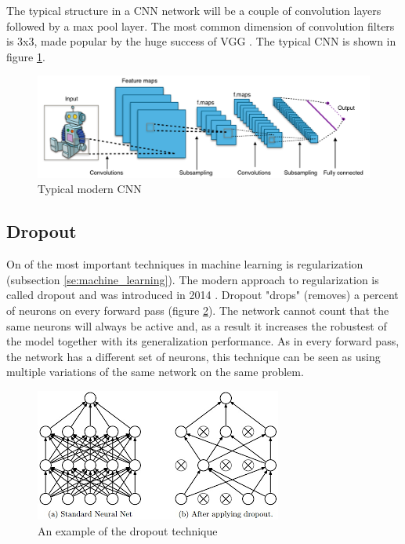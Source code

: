 \documentclass[times, utf8, diplomski]{fer}
\begin{document}
The typical structure in a CNN network will be a couple of convolution layers followed by a max pool layer. The most common dimension of convolution filters is 3x3, made popular by the huge success of VGG \citep{simonyan_very_2014}. The typical CNN is shown in figure \ref{fig:cnn}.

\begin{figure}
  \includegraphics[scale=0.43]{figures/cnn.png}
  \centering
  \caption{Typical modern CNN}
  \label{fig:cnn}
\end{figure}

\subsection{Dropout} \label{se:dropout}

On of the most important techniques in machine learning is regularization (subsection \ref{se:machine_learning}). The modern approach to regularization is called dropout and was introduced in 2014 \citep{srivastava_dropout:_2014}. Dropout "drops" (removes) a percent of neurons on every forward pass (figure \ref{fig:dropout}). The network cannot count that the same neurons will always be active and, as a result it increases the robustest of the model together with its generalization performance. As in every forward pass, the network has a different set of neurons, this technique can be seen as using multiple variations of the same network on the same problem.

\begin{figure}
  \includegraphics[scale=0.91]{figures/dropout.png}
  \centering
  \caption{An example of the dropout technique}
  \label{fig:dropout}
\end{figure}
\end{document}
